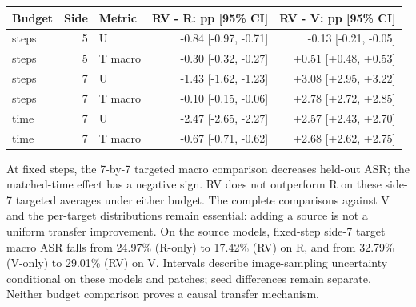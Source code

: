 \documentclass{article}
\begin{document}
\begin{center}\small
\begin{tabular}{lrlrr}\toprule
Budget & Side & Metric & RV - R: pp [95\% CI] & RV - V: pp [95\% CI]\\\midrule
steps & 5 & U & -0.84 [-0.97, -0.71] & -0.13 [-0.21, -0.05]\\
steps & 5 & T macro & -0.30 [-0.32, -0.27] & +0.51 [+0.48, +0.53]\\
steps & 7 & U & -1.43 [-1.62, -1.23] & +3.08 [+2.95, +3.22]\\
steps & 7 & T macro & -0.10 [-0.15, -0.06] & +2.78 [+2.72, +2.85]\\
time & 7 & U & -2.47 [-2.65, -2.27] & +2.57 [+2.43, +2.70]\\
time & 7 & T macro & -0.67 [-0.71, -0.62] & +2.68 [+2.62, +2.75]\\
\bottomrule\end{tabular}\end{center}
At fixed steps, the 7-by-7 targeted macro comparison decreases held-out ASR; the matched-time effect has a negative sign. RV does not outperform R on these side-7 targeted averages under either budget. The complete comparisons against V and the per-target distributions remain essential: adding a source is not a uniform transfer improvement. On the source models, fixed-step side-7 target macro ASR falls from 24.97\% (R-only) to 17.42\% (RV) on R, and from 32.79\% (V-only) to 29.01\% (RV) on V. Intervals describe image-sampling uncertainty conditional on these models and patches; seed differences remain separate. Neither budget comparison proves a causal transfer mechanism.
\clearpage
\end{document}
